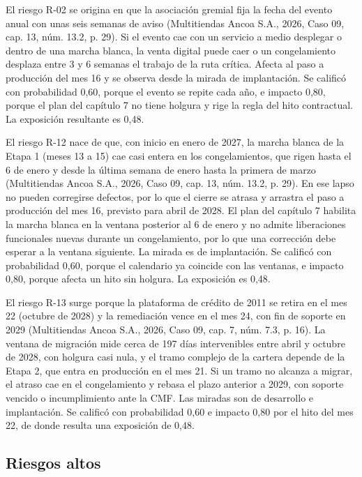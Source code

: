 \documentclass[11pt]{article}
\begin{document}
El riesgo R-02 se origina en que la asociación gremial fija la fecha del evento anual con unas seis semanas de aviso (Multitiendas Ancoa S.A., 2026, Caso 09, cap. 13, núm. 13.2, p. 29). Si el evento cae con un servicio a medio desplegar o dentro de una marcha blanca, la venta digital puede caer o un congelamiento desplaza entre 3 y 6 semanas el trabajo de la ruta crítica. Afecta al paso a producción del mes 16 y se observa desde la mirada de implantación. Se calificó con probabilidad 0,60, porque el evento se repite cada año, e impacto 0,80, porque el plan del capítulo 7 no tiene holgura y rige la regla del hito contractual. La exposición resultante es 0,48.

El riesgo R-12 nace de que, con inicio en enero de 2027, la marcha blanca de la Etapa 1 (meses 13 a 15) cae casi entera en los congelamientos, que rigen hasta el 6 de enero y desde la última semana de enero hasta la primera de marzo (Multitiendas Ancoa S.A., 2026, Caso 09, cap. 13, núm. 13.2, p. 29). En ese lapso no pueden corregirse defectos, por lo que el cierre se atrasa y arrastra el paso a producción del mes 16, previsto para abril de 2028. El plan del capítulo 7 habilita la marcha blanca en la ventana posterior al 6 de enero y no admite liberaciones funcionales nuevas durante un congelamiento, por lo que una corrección debe esperar a la ventana siguiente. La mirada es de implantación. Se calificó con probabilidad 0,60, porque el calendario ya coincide con las ventanas, e impacto 0,80, porque afecta un hito sin holgura. La exposición es 0,48.

El riesgo R-13 surge porque la plataforma de crédito de 2011 se retira en el mes 22 (octubre de 2028) y la remediación vence en el mes 24, con fin de soporte en 2029 (Multitiendas Ancoa S.A., 2026, Caso 09, cap. 7, núm. 7.3, p. 16). La ventana de migración mide cerca de 197 días intervenibles entre abril y octubre de 2028, con holgura casi nula, y el tramo complejo de la cartera depende de la Etapa 2, que entra en producción en el mes 21. Si un tramo no alcanza a migrar, el atraso cae en el congelamiento y rebasa el plazo anterior a 2029, con soporte vencido o incumplimiento ante la CMF. Las miradas son de desarrollo e implantación. Se calificó con probabilidad 0,60 e impacto 0,80 por el hito del mes 22, de donde resulta una exposición de 0,48.

\subsection{Riesgos altos}
\end{document}
